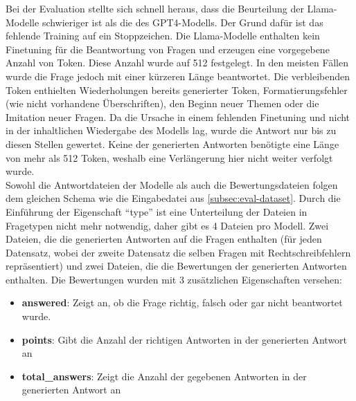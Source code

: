 Bei der Evaluation stellte sich schnell heraus, dass die Beurteilung der Llama-Modelle schwieriger ist als die des GPT4-Modells.
Der Grund dafür ist das fehlende Training auf ein Stoppzeichen.
Die Llama-Modelle enthalten kein Finetuning für die Beantwortung von Fragen und erzeugen eine vorgegebene Anzahl von Token.
Diese Anzahl wurde auf 512 festgelegt.
In den meisten Fällen wurde die Frage jedoch mit einer kürzeren Länge beantwortet.
Die verbleibenden Token enthielten Wiederholungen bereits generierter Token, Formatierungsfehler (wie nicht vorhandene Überschriften), den Beginn neuer Themen oder die Imitation neuer Fragen.
Da die Ursache in einem fehlenden Finetuning und nicht in der inhaltlichen Wiedergabe des Modells lag, wurde die Antwort nur bis zu diesen Stellen gewertet.
Keine der generierten Antworten benötigte eine Länge von mehr als 512 Token, weshalb eine Verlängerung hier nicht weiter verfolgt wurde.\\

Sowohl die Antwortdateien der Modelle als auch die Bewertungsdateien folgen dem gleichen Schema wie die Eingabedatei aus \cref{subsec:eval-dataset}. Durch die Einführung der Eigenschaft \enquote{type} ist eine Unterteilung der Dateien in Fragetypen nicht mehr notwendig, daher gibt es 4 Dateien pro Modell.
Zwei Dateien, die die generierten Antworten auf die Fragen enthalten (für jeden Datensatz, wobei der zweite Datensatz die selben Fragen mit Rechtschreibfehlern repräsentiert) und zwei Dateien, die die Bewertungen der generierten Antworten enthalten.
Die Bewertungen wurden mit 3 zusätzlichen Eigenschaften versehen:

\begin{itemize}
    \item \textbf{answered}: Zeigt an, ob die Frage richtig, falsch oder gar nicht beantwortet wurde.
\item \textbf{points}: Gibt die Anzahl der richtigen Antworten in der generierten Antwort an
    \item \textbf{total\_answers}: Zeigt die Anzahl der gegebenen Antworten in der generierten Antwort an
\end{itemize}

